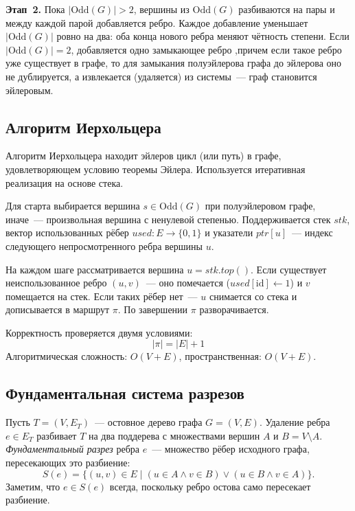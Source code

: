 \textbf{Этап~2.} Пока $|\mathrm{Odd}(G)| > 2$, вершины из
$\mathrm{Odd}(G)$ разбиваются на пары и между каждой парой
добавляется ребро. Каждое добавление уменьшает
$|\mathrm{Odd}(G)|$ ровно на два: оба конца нового ребра меняют
чётность степени. Если $|\mathrm{Odd}(G)| = 2$, добавляется
одно замыкающее ребро ,причем если такое ребро уже существует в графе, то для замыкания полуэйлерова графа до эйлерова оно не дублируется, а извлекается (удаляется) из системы~--- граф становится эйлеровым.

\subsection{Алгоритм Иерхольцера}

Алгоритм Иерхольцера находит эйлеров цикл (или путь) в графе,
удовлетворяющем условию теоремы Эйлера. Используется итеративная
реализация на основе стека.

Для старта выбирается вершина $s \in \mathrm{Odd}(G)$ при
полуэйлеровом графе, иначе~--- произвольная вершина с ненулевой
степенью. Поддерживается стек $\mathit{stk}$, вектор использованных
рёбер $\mathit{used} : E \to \{0,1\}$ и указатели
$\mathit{ptr}[u]$~--- индекс следующего непросмотренного ребра
вершины $u$.

На каждом шаге рассматривается вершина $u = \mathit{stk.top}()$.
Если существует неиспользованное ребро $(u, v)$~--- оно помечается
($\mathit{used}[\mathrm{id}] \leftarrow 1$) и $v$ помещается на стек.
Если таких рёбер нет~--- $u$ снимается со стека и дописывается
в маршрут $\pi$. По завершении $\pi$ разворачивается.

Корректность проверяется двумя условиями:
\[
    |\pi| = |E| + 1
\]
Алгоритмическая сложность: $O(V + E)$, пространственная: $O(V + E)$.

\subsection{Фундаментальная система разрезов}

Пусть $T = (V, E_T)$~--- остовное дерево графа $G = (V, E)$.
Удаление ребра $e \in E_T$ разбивает $T$ на два поддерева с
множествами вершин $A$ и $B = V \setminus A$.
\textit{Фундаментальный разрез} ребра $e$~---
множество рёбер исходного графа, пересекающих это разбиение:
\[
    S(e) = \bigl\{(u, v) \in E \;\big|\;
    (u \in A \wedge v \in B) \vee (u \in B \wedge v \in A)\bigr\}.
\]
Заметим, что $e \in S(e)$ всегда, поскольку ребро остова
само пересекает разбиение.

